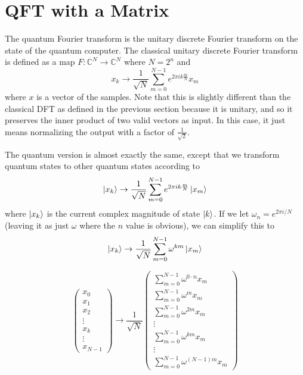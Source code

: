 \documentclass[11pt]{report}
\newcommand{\?}{\stackrel{?}{=}}
\begin{document}
\section{QFT with a Matrix}

The quantum Fourier transform is the unitary discrete Fourier transform on the state of the quantum computer. The classical unitary discrete Fourier transform is defined as a map $F: \mathbb{C}^N \to \mathbb{C}^N$ where $N = 2^n$ and
$$x_k \to \frac{1}{\sqrt{N}}\sum_{m = 0}^{N - 1}e^{2\pi i k \frac{m}{N}} x_m$$
where $x$ is a vector of the samples. Note that this is slightly different than the classical DFT as defined in the previous section because it is unitary, and so it preserves the inner product of two valid vectors as input. In this case, it just means normalizing the output with a factor of $\frac{1}{\sqrt{2}}$. 

The quantum version is almost exactly the same, except that we transform quantum states to other quantum states according to
$$\Ket{x_k} \to \frac{1}{\sqrt{N}}\sum_{m = 0}^{N - 1}e^{2\pi i k \frac{m}{N}} \Ket{x_m}$$
where $\Ket{x_k}$ is the current complex magnitude of state $\Ket{k}$. If we let $\omega_{n} = e^{2\pi i /N}$ (leaving it as just $\omega$ where the $n$ value is obvious), we can simplify this to
$$\Ket{x_k} \to \frac{1}{\sqrt{N}}\sum_{m = 0}^{N - 1}\omega^{km} \Ket{x_m}$$

$$\begin{pmatrix}
	x_0 \\
	x_1 \\
	x_2 \\
	\vdots \\
    x_k \\
    \vdots \\
    x_{N-1}
  \end{pmatrix}
\to \frac{1}{\sqrt{N}}
  \begin{pmatrix}
	\sum_{m=0}^{N-1} \omega^{0\cdot n} x_m\\
	\sum_{m=0}^{N-1} \omega^{m} x_m \\
	\sum_{m=0}^{N-1} \omega^{2m} x_m \\
	\vdots \\
    \sum_{m=0}^{N-1} \omega^{km} x_m \\
    \vdots \\
    \sum_{m=0}^{N-1} \omega^{(N-1)m} x_m
  \end{pmatrix}
$$
\end{document}
